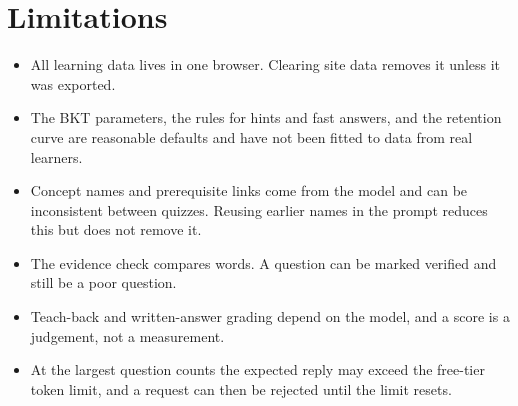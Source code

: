 \section{Limitations}
\begin{itemize}
\item All learning data lives in one browser. Clearing site data removes it unless it was exported.
\item The BKT parameters, the rules for hints and fast answers, and the retention curve are reasonable defaults and have not been fitted to data from real learners.
\item Concept names and prerequisite links come from the model and can be inconsistent between quizzes. Reusing earlier names in the prompt reduces this but does not remove it.
\item The evidence check compares words. A question can be marked verified and still be a poor question.
\item Teach-back and written-answer grading depend on the model, and a score is a judgement, not a measurement.
\item At the largest question counts the expected reply may exceed the free-tier token limit, and a request can then be rejected until the limit resets.
\end{itemize}
